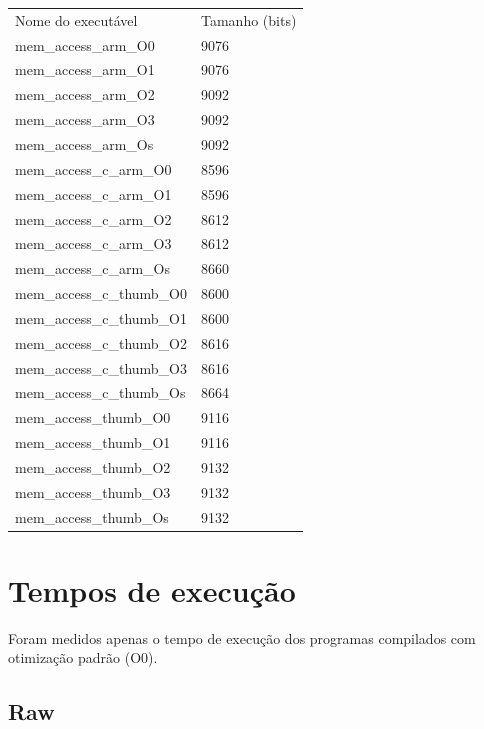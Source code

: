 \documentclass[a4paper,10pt]{article}
\begin{document}
\begin{table}[H]
\begin{tabular}{ll}
\rowcolor[HTML]{CBCEFB} 
Nome do executável & Tamanho (bits) \\
mem\_access\_arm\_O0 & 9076 \\
\rowcolor[HTML]{C0C0C0} 
mem\_access\_arm\_O1 & 9076 \\
mem\_access\_arm\_O2 & 9092 \\
\rowcolor[HTML]{C0C0C0} 
mem\_access\_arm\_O3 & 9092 \\
mem\_access\_arm\_Os & 9092 \\
\rowcolor[HTML]{C0C0C0} 
mem\_access\_c\_arm\_O0 & 8596 \\
mem\_access\_c\_arm\_O1 & 8596 \\
\rowcolor[HTML]{C0C0C0} 
mem\_access\_c\_arm\_O2 & 8612 \\
mem\_access\_c\_arm\_O3 & 8612 \\
\rowcolor[HTML]{C0C0C0} 
mem\_access\_c\_arm\_Os & 8660 \\
mem\_access\_c\_thumb\_O0 & 8600 \\
\rowcolor[HTML]{C0C0C0} 
mem\_access\_c\_thumb\_O1 & 8600 \\
mem\_access\_c\_thumb\_O2 & 8616 \\
\rowcolor[HTML]{C0C0C0} 
mem\_access\_c\_thumb\_O3 & 8616 \\
mem\_access\_c\_thumb\_Os & 8664 \\
\rowcolor[HTML]{C0C0C0} 
mem\_access\_thumb\_O0 & 9116 \\
mem\_access\_thumb\_O1 & 9116 \\
\rowcolor[HTML]{C0C0C0} 
mem\_access\_thumb\_O2 & 9132 \\
mem\_access\_thumb\_O3 & 9132 \\
\rowcolor[HTML]{C0C0C0} 
mem\_access\_thumb\_Os & 9132
\end{tabular}
\end{table}

\section*{Tempos de execução}

Foram medidos apenas o tempo de execução dos programas compilados com otimização padrão (O0).

\subsection*{Raw}
\end{document}
